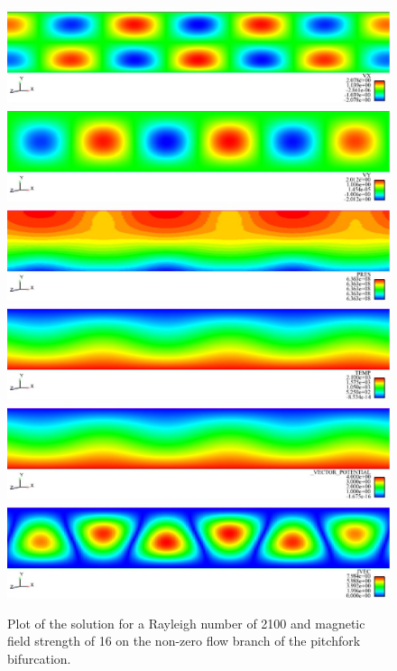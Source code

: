 \documentclass[pdf,ps2pdf,11pt]{SANDreport}
\begin{document}
{\bsinglespace
\begin{figure}
\begin{center}
\includegraphics*[angle=0,scale=0.3]{figures/ms_vx.eps}
\includegraphics*[angle=0,scale=0.3]{figures/ms_vy.eps}
\includegraphics*[angle=0,scale=0.3]{figures/ms_pres.eps}
\includegraphics*[angle=0,scale=0.3]{figures/ms_temp.eps}
\includegraphics*[angle=0,scale=0.3]{figures/ms_vectorpotential.eps}
\includegraphics*[angle=0,scale=0.3]{figures/ms_current.eps}
\caption[Solution of the hydromagnetic Rayleigh-Bernard problem]{
\label{fig:hrbFlow}
Plot of the solution for a Rayleigh number of 2100 and magnetic field strength
of 16 on the non-zero flow branch of the pitchfork bifurcation.}
\end{center}
\end{figure}
\esinglespace}
 
\end{document}
